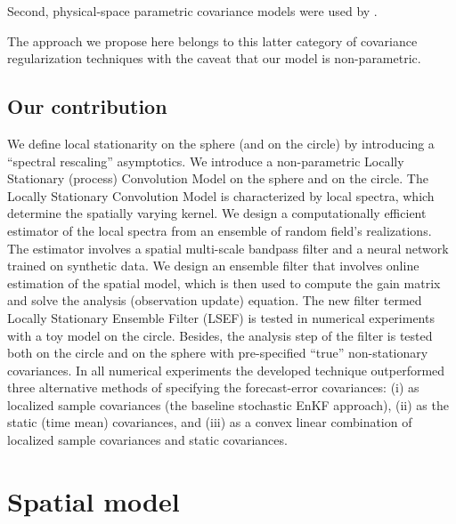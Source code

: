 \documentclass[12pt]{article}
\begin{document}
\begin{enumerate}
Second, physical-space parametric covariance models were used by \citet{Skauvold}.

The  approach we propose here belongs to this latter category of covariance regularization techniques
with the caveat that our model is non-parametric.





\end{enumerate}





\subsection {Our contribution}
\label{sec_contrib}



We define local stationarity on the sphere (and on the circle) by introducing a ``spectral rescaling'' asymptotics.
We introduce a non-parametric  Locally Stationary (process) Convolution Model
on the sphere and on the circle. 
The Locally Stationary Convolution Model is characterized by local spectra, which determine the spatially varying  kernel.
We design a computationally efficient estimator of the local spectra from
an ensemble of random field's realizations.
The estimator involves a spatial multi-scale bandpass filter and a neural network
trained on synthetic data.
We design an ensemble filter that involves online estimation of the spatial model, which
is then used to compute the gain matrix and solve the analysis (observation update) equation.
The new filter termed Locally Stationary Ensemble Filter (LSEF) is tested in numerical experiments
with a toy model on the circle. Besides, the analysis step of the filter is tested both on the circle and on 
the sphere with pre-specified ``true'' non-stationary covariances. In all numerical experiments
the developed technique outperformed three alternative methods of specifying the forecast-error covariances:
(i) as localized sample covariances (the baseline stochastic EnKF approach), 
(ii) as the static (time mean) covariances, and 
(iii) as a convex linear combination of localized sample covariances and static covariances.






\section {Spatial model}
\label{sec_conv}
\end{document}
